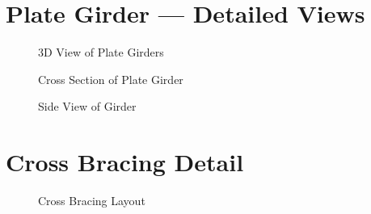 \documentclass[12pt,a4paper]{report}
\numberwithin{table}{chapter}
\numberwithin{figure}{chapter}
\begin{document}
\section{Plate Girder --- Detailed Views}
\label{sec:girder-views}

\begin{figure}[H]
\centering
{}
\caption{3D View of Plate Girders}
\label{fig:girder-3d}
\end{figure}


\begin{figure}[H]
\centering
{}
\caption{Cross Section of Plate Girder}
\label{fig:girder-xsec}
\end{figure}


\begin{figure}[H]
\centering
{}
\caption{Side View of Girder}
\label{fig:girder-side}
\end{figure}


\section{Cross Bracing Detail}
\label{sec:bracing-detail}

\begin{figure}[H]
\centering
{}
\caption{Cross Bracing Layout}
\label{fig:cb-layout}
\end{figure}


\noindent
\begin{minipage}[t]{0.31\textwidth}
\centering
{}
\label{fig:cb-bracing-sec}
\end{minipage}
\hfill
\begin{minipage}[t]{0.31\textwidth}
\centering
{}
\label{fig:cb-top-chord}
\end{minipage}
\hfill
\begin{minipage}[t]{0.31\textwidth}
\centering
{}
\label{fig:cb-bottom-chord}
\end{minipage}
            
\end{document}
